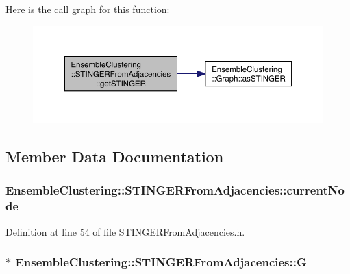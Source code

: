 Here is the call graph for this function\-:\nopagebreak
\begin{figure}[H]
\begin{center}
\leavevmode
\includegraphics[width=350pt]{class_ensemble_clustering_1_1_s_t_i_n_g_e_r_from_adjacencies_a3d19e2860c0a1d2e4e43f87523dfd97a_cgraph}
\end{center}
\end{figure}




\subsection{Member Data Documentation}
\hypertarget{class_ensemble_clustering_1_1_s_t_i_n_g_e_r_from_adjacencies_a5ee544e2493998867bd1cd7e98d72575}{
\subsubsection[{current\-Node}]{ Ensemble\-Clustering\-::\-S\-T\-I\-N\-G\-E\-R\-From\-Adjacencies\-::current\-Node\hspace{0.3cm}{\ttfamily [protected]}}}\label{class_ensemble_clustering_1_1_s_t_i_n_g_e_r_from_adjacencies_a5ee544e2493998867bd1cd7e98d72575}


Definition at line 54 of file S\-T\-I\-N\-G\-E\-R\-From\-Adjacencies.\-h.

\hypertarget{class_ensemble_clustering_1_1_s_t_i_n_g_e_r_from_adjacencies_a5376c951560b41a3a6ad24edddf143ee}{
\subsubsection[{G}]{$\ast$ Ensemble\-Clustering\-::\-S\-T\-I\-N\-G\-E\-R\-From\-Adjacencies\-::\-G\hspace{0.3cm}{\ttfamily [protected]}}}\label{class_ensemble_clustering_1_1_s_t_i_n_g_e_r_from_adjacencies_a5376c951560b41a3a6ad24edddf143ee}


